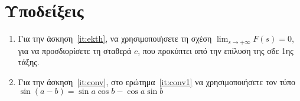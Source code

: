 \section*{Υποδείξεις}

\begin{enumerate}
  \item Για την άσκηση~\ref{it:ekth}, να χρησιμοποιήσετε τη σχέση
    $ \lim\nolimits_{s\to+\infty}F(s)=0 $, για να προσδιορίσετε τη σταθερά $c$, που 
    προκύπτει από την επίλυση της σδε 1ης τάξης.
  \item Για την άσκηση~\ref{it:conv}, στο ερώτημα~\ref{it:conv1} να χρησιμοποιήσετε
    τον τύπο $ \sin{(a-b)} = \sin{a} \cos{b} - \cos{a} \sin{b} $ 
\end{enumerate}



